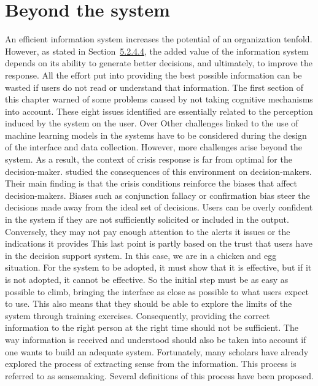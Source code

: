 \section{Beyond the system}
An efficient information system increases the potential of an organization tenfold.
However, as stated in Section~\hyperref[sec:information-distribution]{5.2.4.4}, the added value of the information system depends on its ability to generate better decisions, and ultimately, to improve the response.
All the effort put into providing the best possible information can be wasted if users do not read or understand that information.
The first section of this chapter warned of some problems caused by not taking cognitive mechanisms into account.
These eight issues identified are essentially related to the perception induced by the system on the user.
Over
Other challenges linked to the use of machine learning models in the systems have to be considered during the design of the interface and data collection.
However, more challenges arise beyond the system.
As a result, the context of crisis response is far from optimal for the decision-maker.
\textcite{comesCognitiveBiasesHumanitarian2016} studied the consequences of this environment on decision-makers.
Their main finding is that the crisis conditions reinforce the biases that affect decision-makers.
Biases such as conjunction fallacy or confirmation bias steer the decisions made away from the ideal set of decisions.
Users can be overly confident in the system if they are not sufficiently solicited or included in the output.
Conversely, they may not pay enough attention to the alerts it issues or the indications it provides
This last point is partly based on the trust that users have in the decision support system.
In this case, we are in a chicken and egg situation.
For the system to be adopted, it must show that it is effective, but if it is not adopted, it cannot be effective.
So the initial step must be as easy as possible to climb, bringing the interface as close as possible to what users expect to use.
This also means that they should be able to explore the limits of the system through training exercises.
Consequently, providing the correct information to the right person at the right time should not be sufficient.
The way information is received and understood should also be taken into account if one wants to build an adequate system.
Fortunately, many scholars have already explored the process of extracting sense from the information.
This process is referred to as sensemaking.
Several definitions of this process have been proposed.
